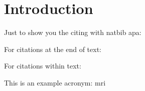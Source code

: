 \section{Introduction}


Just to show you the citing with natbib apa:

For citations at the end of text: \citep{Flor1998}

For citations within text: \citet{Flor1998}


This is an example acronym: \acrfull{mri}

